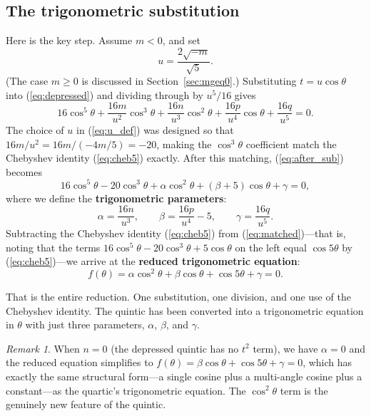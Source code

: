 \documentclass[12pt]{article}
\theoremstyle{definition}
\theoremstyle{remark}
\newtheorem{remark}[theorem]{Remark}
\begin{document}
\subsection{The trigonometric substitution}

Here is the key step. Assume $m < 0$, and set
\begin{equation}\label{eq:u_def}
u = \frac{2\sqrt{-m}}{\sqrt{5}}.
\end{equation}
(The case $m \geq 0$ is discussed in Section~\ref{sec:mgeq0}.) Substituting $t = u\cos\theta$ into (\ref{eq:depressed}) and dividing through by $u^5/16$ gives
\begin{equation}\label{eq:after_sub}
16\cos^5\theta + \frac{16m}{u^2}\cos^3\theta + \frac{16n}{u^3}\cos^2\theta + \frac{16p}{u^4}\cos\theta + \frac{16q}{u^5} = 0.
\end{equation}
The choice of $u$ in (\ref{eq:u_def}) was designed so that $16m/u^2 = 16m/(-4m/5) = -20$, making the $\cos^3\!\theta$ coefficient match the Chebyshev identity (\ref{eq:cheb5}) exactly. After this matching, (\ref{eq:after_sub}) becomes
\begin{equation}\label{eq:matched}
16\cos^5\theta - 20\cos^3\theta + \alpha\cos^2\theta + (\beta + 5)\cos\theta + \gamma = 0,
\end{equation}
where we define the \textbf{trigonometric parameters}:
\begin{equation}\label{eq:params}
\boxed{\alpha = \frac{16n}{u^3}, \qquad \beta = \frac{16p}{u^4} - 5, \qquad \gamma = \frac{16q}{u^5}.}
\end{equation}
Subtracting the Chebyshev identity (\ref{eq:cheb5}) from (\ref{eq:matched})---that is, noting that the terms $16\cos^5\!\theta - 20\cos^3\!\theta + 5\cos\theta$ on the left equal $\cos 5\theta$ by (\ref{eq:cheb5})---we arrive at the \textbf{reduced trigonometric equation}:
\begin{equation}\label{eq:f_def}
\boxed{f(\theta) = \alpha\cos^2\theta + \beta\cos\theta + \cos 5\theta + \gamma = 0.}
\end{equation}

That is the entire reduction. One substitution, one division, and one use of the Chebyshev identity. The quintic has been converted into a trigonometric equation in $\theta$ with just three parameters, $\alpha$, $\beta$, and $\gamma$.

\begin{remark}\label{rem:n_zero}
When $n = 0$ (the depressed quintic has no $t^2$ term), we have $\alpha = 0$ and the reduced equation simplifies to $f(\theta) = \beta\cos\theta + \cos 5\theta + \gamma = 0$, which has exactly the same structural form---a single cosine plus a multi-angle cosine plus a constant---as the quartic's trigonometric equation. The $\cos^2\!\theta$ term is the genuinely new feature of the quintic.
\end{remark}
\end{document}
